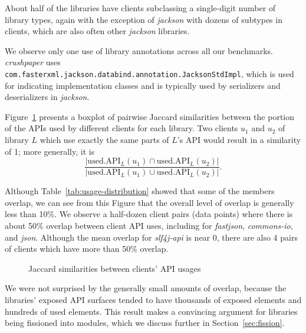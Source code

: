 About half of the libraries have clients subclassing a
single-digit number of library types, again with the exception of
\emph{jackson} with dozens of subtypes in clients, which are also often other \emph{jackson} libraries.

We observe only one use of library annotations across all our benchmarks. \emph{crushpaper} uses \texttt{com.fasterxml.jackson.databind.annotation.JacksonStdImpl}, which is used for indicating implementation classes and is typically used by serializers and deserializers in \emph{jackson}.

Figure~\ref{fig:jaccard} presents a boxplot of
pairwise Jaccard similarities between the portion of
the APIs used by different clients for each library. Two clients $u_1$ and $u_2$ 
of library $L$ which use exactly the same parts of $L$'s API would result in a similarity of 1;
more generally, it is
\[ \frac{|\mbox{used.API}_L(u_1) \cap \mbox{used.API}_L(u_2)|}{|\mbox{used.API}_L(u_1) \cup \mbox{used.API}_L(u_2)|}. \]

Although Table~\ref{tab:usage-distribution} showed that some of the members overlap, we can
see from this Figure that the overall level of overlap is generally less than 10\%. We observe
a half-dozen client pairs (data points) where there is about 50\% overlap between client API uses, including for \emph{fastjson},
\emph{commons-io}, and \emph{json}. Although the mean overlap for \emph{slf4j-api} is near 0, there are also 4 pairs of clients which have more than 50\% overlap.

\begin{center}
\begin{figure}
\centering
\caption{\label{fig:jaccard}Jaccard similarities between clients' API usages}
\end{figure}
\end{center}

We were not surprised by the generally small amounts of overlap, because the libraries' exposed API surfaces tended
to have thousands of exposed elements and hundreds of used elements. This result makes a convincing argument for libraries being fissioned into modules, which we discuss further in Section~\ref{sec:fission}. 

